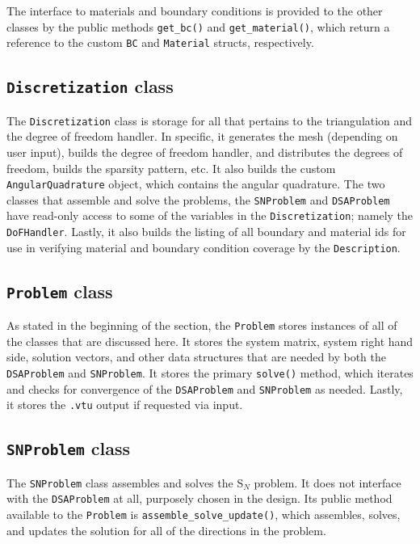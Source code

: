 \documentclass{article}
\begin{document}
The interface to materials and boundary conditions is provided to the other classes by the public methods \texttt{get\_bc()} and \texttt{get\_material()}, which return a reference to the custom \texttt{BC} and \texttt{Material} structs, respectively.

\subsection{\texttt{Discretization} class}

The \texttt{Discretization} class is storage for all that pertains to the triangulation and the degree of freedom handler. In specific, it generates the mesh (depending on user input), builds the degree of freedom handler, and distributes the degrees of freedom, builds the sparsity pattern, etc. It also builds the custom \texttt{AngularQuadrature} object, which contains the angular quadrature. The two classes that assemble and solve the problems, the \texttt{SNProblem} and \texttt{DSAProblem} have read-only access to some of the variables in the \texttt{Discretization}; namely the \texttt{DoFHandler}. Lastly, it also builds the listing of all boundary and material ids for use in verifying material and boundary condition coverage by the \texttt{Description}.

\subsection{\texttt{Problem} class}

As stated in the beginning of the section, the \texttt{Problem} stores instances of all of the classes that are discussed here. It stores the system matrix, system right hand side, solution vectors, and other data structures that are needed by both the \texttt{DSAProblem} and \texttt{SNProblem}. It stores the primary \texttt{solve()} method, which iterates and checks for convergence of the \texttt{DSAProblem} and \texttt{SNProblem} as needed. Lastly, it stores the \texttt{.vtu} output if requested via input.

\subsection{\texttt{SNProblem} class}

The \texttt{SNProblem} class assembles and solves the S$_N$ problem. It does not interface with the \texttt{DSAProblem} at all, purposely chosen in the design. Its public method available to the \texttt{Problem} is \texttt{assemble\_solve\_update()}, which assembles, solves, and updates the solution for all of the directions in the problem.
\end{document}

